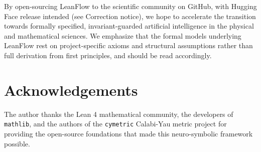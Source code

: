\documentclass[11pt,a4paper]{article}
\begin{document}
By open-sourcing LeanFlow to the scientific community on GitHub, with Hugging Face release intended (see Correction notice), we hope to accelerate the transition towards formally specified, invariant-guarded artificial intelligence in the physical and mathematical sciences. We emphasize that the formal models underlying LeanFlow rest on project-specific axioms and structural assumptions rather than full derivation from first principles, and should be read accordingly.

\section*{Acknowledgements}
The author thanks the Lean 4 mathematical community, the developers of \texttt{mathlib}, and the authors of the \texttt{cymetric} Calabi-Yau metric project for providing the open-source foundations that made this neuro-symbolic framework possible.
\end{document}
